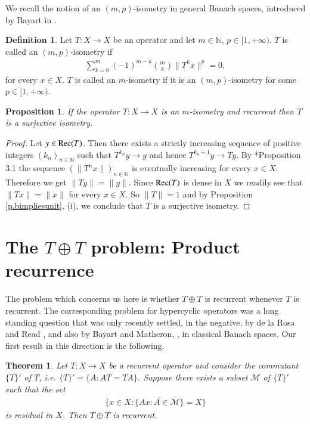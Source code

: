 \documentclass[12pt,leqno]{amsart}
\theoremstyle{plain}
\newtheorem{proposition}[equation]{Proposition}
\newtheorem{theorem}[equation]{Theorem}
\theoremstyle{definition}
\newtheorem{definition}[equation]{Definition}
\numberwithin{equation}{section}
\begin{document}
We recall the notion of an $(m,p)$-isometry in general Banach spaces, introduced by Bayart in \cite{B1}. 

\begin{definition}
	Let $T:X\to X$ be an operator and let $m\in \mathbb{N}$, $p\in [1,+\infty)$. $T$ is called an $(m,p)$-isometry if 
	\begin{align*}
		\sum_{k=0}^{m}(-1)^{m-k}\binom{m}{k}\| T^kx\|^p=0 , 
	\end{align*}
	for every $x\in X$. $T$ is called an $m$-isometry if it is an $(m,p)$-isometry for some $p\in [1,+\infty )$. 
\end{definition}

\begin{proposition}
	If the operator $T:X\to X$ is an $m$-isometry and recurrent then $T$ is a surjective isometry. 
\end{proposition}

\begin{proof}
	Let $y\in {\textnormal{Rec}}(T)$. Then there exists a strictly increasing sequence of positive integers $(k_n)_{n\in\mathbb N}$ such that $T^{k_n}y\to y$ and hence $T^{k_n+1}y\to Ty$. By \cite{B1}*{Proposition 3.1} the sequence $(\| T^nx\|)_{n\in\mathbb N}$ is eventually increasing for every $x\in X$. Therefore we get $\| Ty\| =\| y\|$. Since ${\textnormal{Rec}}(T)$ is dense in $X$ we readily see that $\| Tx\| =\| x\|$ for every $x\in X$. So $\| T\| =1$ and by Proposition \ref{p.bimpliesunit}, (i), we conclude that $T$ is a surjective isometry. 
\end{proof}

\section{The \texorpdfstring{$T\oplus T$}{T+T} problem: Product recurrence} \label{s.toplust} The problem which concerns us here is whether $T\oplus T$ is recurrent whenever $T$ is recurrent. The corresponding problem for hypercyclic operators was a long standing question that was only recently settled, in the negative, by de la Rosa and Read \cite{DR}, and also by Bayart and Matheron, \cite{BM2}, in classical Banach spaces. Our first result in this direction is the following. 

\begin{theorem}
	\label{t.prodrec} Let $T:X\to X$ be a recurrent operator and consider the commutant $\{ T \}'$ of $T$, i.e. $\{ T\}'=\{ A: AT=TA \}$. Suppose there exists a subset $\mathcal M$ of $\{ T \}'$ such that the set 
	\begin{align*}
		\{ x\in X: \overline{ \{Ax: A\in \mathcal M \} }=X \} 
	\end{align*}
	is residual in $X$. Then $T\oplus T$ is recurrent. 
\end{theorem}
\end{document}
